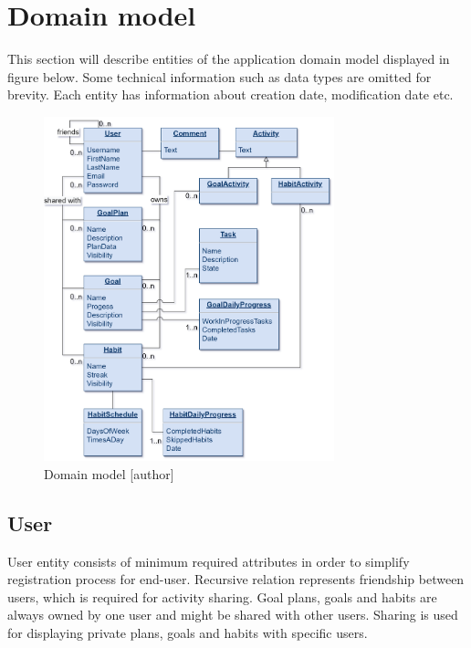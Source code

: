 
\section{Domain model}\label{sec:domain-model}

This section will describe entities of the application domain model displayed in figure below.
Some technical information such as data types are omitted for brevity.
Each entity has information about creation date, modification date etc.

\begin{figure}[h]
    \includegraphics[width=0.75\textwidth]{images/pda-domain-model}
    \caption{Domain model [author]}
    \label{fig:domain-model}
\end{figure}


\subsection{User}\label{subsec:user}

User entity consists of minimum required attributes in order to simplify registration process for end-user.
Recursive relation represents friendship between users, which is required for activity sharing.
Goal plans, goals and habits are always owned by one user and might be shared with other users.
Sharing is used for displaying private plans, goals and habits with specific users.

